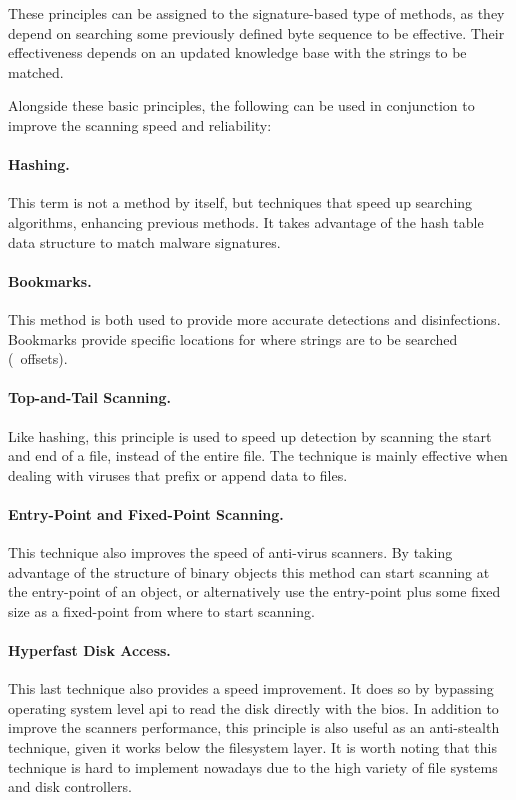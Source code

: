 \medskip

These principles can be assigned to the signature-based type of methods, as they depend on searching some previously defined byte sequence to be effective.
Their effectiveness depends on an updated knowledge base with the strings to be matched.

Alongside these basic principles, the following can be used in conjunction to improve the scanning speed and reliability:

\paragraph{Hashing.} This term is not a method by itself, but techniques that speed up searching algorithms, enhancing previous methods.
It takes advantage of the hash table data structure to match malware signatures.

\paragraph{Bookmarks.} This method is both used to provide more accurate detections and disinfections. Bookmarks provide specific locations for where strings are to be searched (\ie\ offsets).

\paragraph{Top-and-Tail Scanning.} Like hashing, this principle is used to speed up detection by scanning the start and end of a file, instead of the entire file.
The technique is mainly effective when dealing with viruses that prefix or append data to files.

\paragraph{Entry-Point and Fixed-Point Scanning.} This technique also improves the speed of anti-virus scanners.
By taking advantage of the structure of binary objects this method can start scanning at the entry-point of an object, or alternatively use the entry-point plus some fixed size as a fixed-point from where to start scanning.

\paragraph{Hyperfast Disk Access.} This last technique also provides a speed improvement.
It does so by bypassing operating system level \gls{api} to read the disk directly with the \gls{bios}.
In addition to improve the scanners performance, this principle is also useful as an anti-stealth technique, given it works below the filesystem layer.
It is worth noting that this technique is hard to implement nowadays due to the high variety of file systems and disk controllers.

